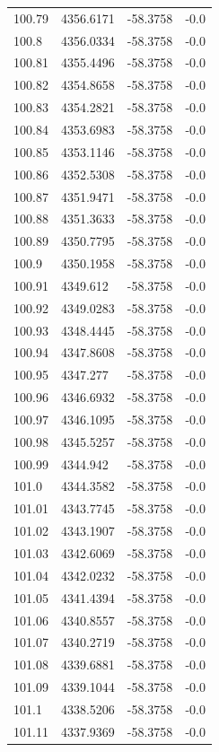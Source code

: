 \begin{table}[H]
\begin{tabular}{llll}
100.79 & 4356.6171 & -58.3758 & -0.0 \\
100.8 & 4356.0334 & -58.3758 & -0.0 \\
100.81 & 4355.4496 & -58.3758 & -0.0 \\
100.82 & 4354.8658 & -58.3758 & -0.0 \\
100.83 & 4354.2821 & -58.3758 & -0.0 \\
100.84 & 4353.6983 & -58.3758 & -0.0 \\
100.85 & 4353.1146 & -58.3758 & -0.0 \\
100.86 & 4352.5308 & -58.3758 & -0.0 \\
100.87 & 4351.9471 & -58.3758 & -0.0 \\
100.88 & 4351.3633 & -58.3758 & -0.0 \\
100.89 & 4350.7795 & -58.3758 & -0.0 \\
100.9 & 4350.1958 & -58.3758 & -0.0 \\
100.91 & 4349.612 & -58.3758 & -0.0 \\
100.92 & 4349.0283 & -58.3758 & -0.0 \\
100.93 & 4348.4445 & -58.3758 & -0.0 \\
100.94 & 4347.8608 & -58.3758 & -0.0 \\
100.95 & 4347.277 & -58.3758 & -0.0 \\
100.96 & 4346.6932 & -58.3758 & -0.0 \\
100.97 & 4346.1095 & -58.3758 & -0.0 \\
100.98 & 4345.5257 & -58.3758 & -0.0 \\
100.99 & 4344.942 & -58.3758 & -0.0 \\
101.0 & 4344.3582 & -58.3758 & -0.0 \\
101.01 & 4343.7745 & -58.3758 & -0.0 \\
101.02 & 4343.1907 & -58.3758 & -0.0 \\
101.03 & 4342.6069 & -58.3758 & -0.0 \\
101.04 & 4342.0232 & -58.3758 & -0.0 \\
101.05 & 4341.4394 & -58.3758 & -0.0 \\
101.06 & 4340.8557 & -58.3758 & -0.0 \\
101.07 & 4340.2719 & -58.3758 & -0.0 \\
101.08 & 4339.6881 & -58.3758 & -0.0 \\
101.09 & 4339.1044 & -58.3758 & -0.0 \\
101.1 & 4338.5206 & -58.3758 & -0.0 \\
101.11 & 4337.9369 & -58.3758 & -0.0 \\

\end{tabular}
\end{table}
